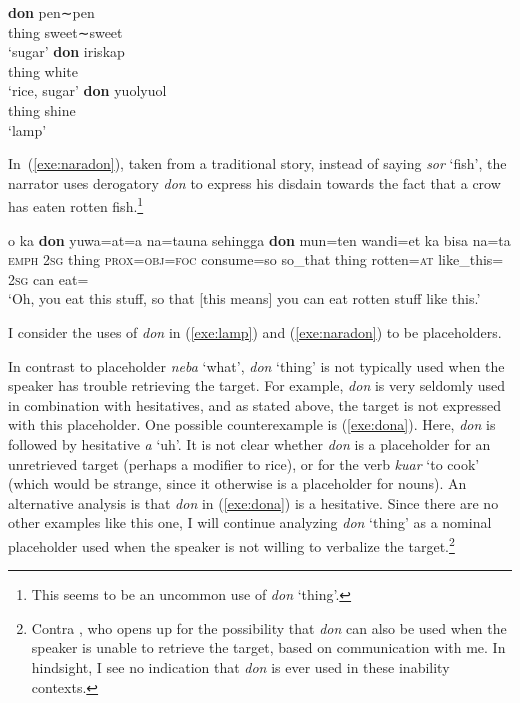 \documentclass[output=paper,colorlinks,citecolor=brown
\ChapterDOI{10.5281/zenodo.15697587}
]{langscibook}
\begin{document}
\begin{exe} 
	\ex
		\begin{xlist}
			\ex \gll \textbf{don} pen∼pen\\
			thing sweet∼sweet\\
			\glt `sugar'
			\ex \gll \textbf{don} iriskap\\
			thing white\\
			\glt `rice, sugar'
			\ex \gll \textbf{don} yuolyuol\\
			thing shine\\
			\glt `lamp' 
		\end{xlist}	
	\label{exe:lamp}
\end{exe}


In~(\ref{exe:naradon}), taken from a traditional story, instead of saying \textit{sor} `fish', the narrator uses derogatory \textit{don} to express his disdain towards the fact that a crow has eaten rotten fish.\footnote{This seems to be an uncommon use of \textit{don} `thing'.}

\begin{exe}
	\ex \gll o ka \textbf{don} yuwa=at=a na=tauna sehingga \textbf{don} mun=ten wandi=et ka bisa na=ta\\
	\textsc{emph} \textsc{2sg} thing \textsc{prox=obj=foc} consume=so so\_that thing rotten=\textsc{at} like\_this={\glet} \textsc{2sg} can eat={\glta}\\
	\glt `Oh, you eat this stuff, so that [this means] you can eat rotten stuff like this.' 
	\label{exe:naradon}
\end{exe}

I consider the uses of \textit{don} in (\ref{exe:lamp}) and (\ref{exe:naradon}) to be placeholders.

In contrast to placeholder \textit{neba} `what', \textit{don} `thing' is not typically used when the speaker has trouble retrieving the target. For example, \textit{don} is very seldomly used in combination with hesitatives, and as stated above, the target is not expressed with this placeholder. One possible counterexample is (\ref{exe:dona}). Here, \textit{don} is followed by hesitative \textit{a} `uh'. It is not clear whether \textit{don} is a placeholder for an unretrieved target (perhaps a modifier to rice), or for the verb \textit{kuar} `to cook' (which would be strange, since it otherwise is a placeholder for nouns). An alternative analysis is that \textit{don} in (\ref{exe:dona}) is a hesitative. Since there are no other examples like this one, I will continue analyzing \textit{don} `thing' as a nominal placeholder used when the speaker is not willing to verbalize the target.\footnote{Contra \citet[16]{seraku2024placeholders}, who opens up for the possibility that \textit{don} can also be used when the speaker is unable to retrieve the target, based on communication with me. In hindsight, I see no indication that \textit{don} is ever used in these inability contexts.}
\end{document}
